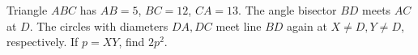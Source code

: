 Triangle $ABC$ has $AB=5$, $BC=12$, $CA=13$. The angle bisector $BD$ meets $AC$ at $D$. The circles with diameters $DA,DC$ meet line $BD$ again at $X\ne D,Y\ne D$, respectively. If $p=XY$, find $2p^2$.
